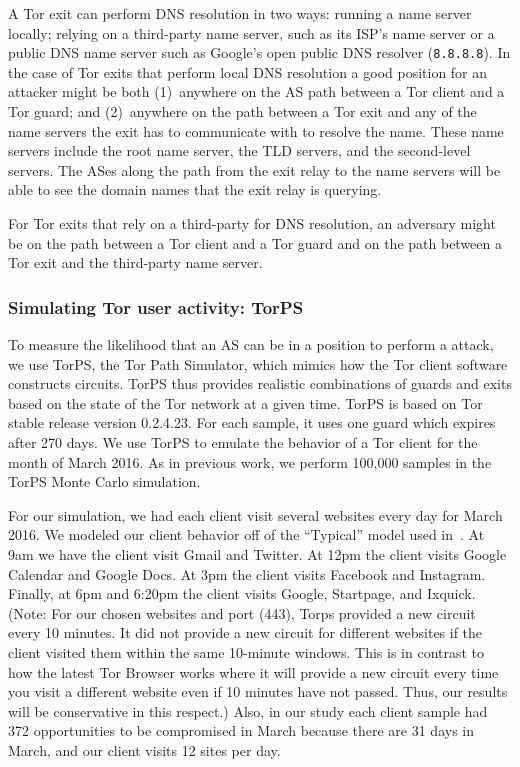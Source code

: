 A Tor exit can perform DNS resolution in two ways: running a name server
locally; relying on a third-party name server, such as its ISP's name
server or a public DNS name server such as Google's open public DNS
resolver ({\tt 8.8.8.8}).  In the case of Tor
exits that perform local DNS resolution a good position for an attacker
might be both (1)~anywhere on the AS path between a Tor client and a Tor
guard; and (2)~anywhere on the path between a Tor exit and any of the
name servers the exit has to communicate with to resolve the name.
These name servers include the root name server, the TLD servers, and
the second-level servers.  The ASes along the path from the exit relay
to the name servers will be able to see the domain names that the exit
relay is querying.

For Tor exits that rely on a third-party for DNS resolution, an
adversary might be on the path between a Tor client and a
Tor guard and on the path between a Tor exit and the third-party name
server.  

\subsubsection{Simulating Tor user activity: TorPS}

To measure the likelihood that an AS can be in a position to perform a
\name attack, we use TorPS, the Tor Path Simulator, which mimics how the
Tor client software constructs circuits.  TorPS thus provides realistic
combinations of guards and exits based on the state of the Tor network
at a given time. TorPS is based on Tor stable release version 0.2.4.23. 
For each sample, 
it uses one guard which expires after 270 days. We use TorPS to emulate
the behavior of a Tor client for the month of March 2016.  As in
previous work, we perform 100,000 samples in the TorPS Monte Carlo
simulation.  

For our simulation, we had each client visit several websites every day for
March 2016.  We modeled our client behavior off of the ``Typical'' model 
used in~\cite{Johnson2013a}.  At 9am we have the client visit Gmail and Twitter.  
At 12pm the client visits Google Calendar and Google Docs. At 3pm the client 
visits Facebook and Instagram. Finally, at 6pm and 6:20pm the client visits Google, 
Startpage, and Ixquick.  (Note: For our chosen websites and port (443), 
Torps provided a new circuit every 10 minutes.  It did not provide a new circuit 
for different websites if the client visited them within the same 10-minute windows. 
This is in contrast to how the latest Tor Browser works where it will provide a new 
circuit every time you visit a different website even if 10 minutes have not passed.  
Thus, our results will be conservative in this respect.)  Also, in our study each 
client sample had 372 opportunities to be compromised in March because there are 31 
days in March, and our client visits 12 sites per day.

